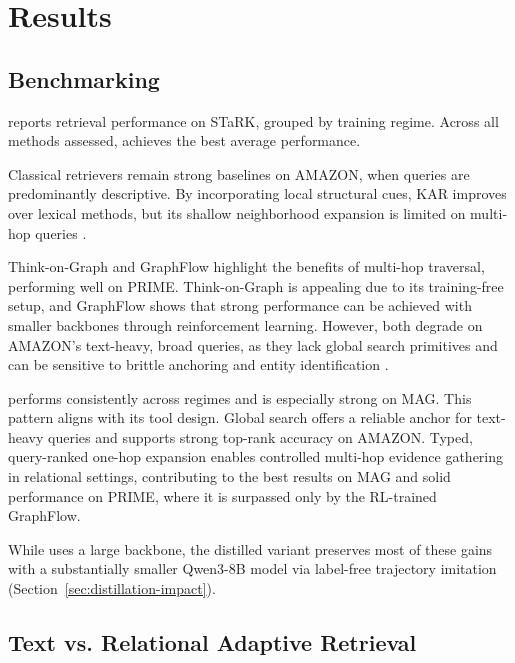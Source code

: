 
\section{Results}

\subsection{Benchmarking}
\FigNAgents
{} reports retrieval performance on STaRK, grouped by training regime. Across all methods assessed, \retrieverShort achieves the best average performance. 

Classical retrievers remain strong baselines on AMAZON, when queries are predominantly descriptive. By incorporating local structural cues, KAR improves over lexical methods, but its shallow neighborhood expansion is limited on multi-hop queries \cite{xia_knowledge-aware_2025}.

Think-on-Graph and GraphFlow highlight the benefits of multi-hop traversal, performing well on PRIME. Think-on-Graph is appealing due to its training-free setup, and GraphFlow shows that strong performance can be achieved with smaller backbones through reinforcement learning. However, both degrade on AMAZON's text-heavy, broad queries, as they lack global search primitives and can be sensitive to brittle anchoring and entity identification \cite{sun_think--graph_2024, yu_can_2025}.

\retrieverShort performs consistently across regimes and is especially strong on MAG. This pattern aligns with its tool design. Global search offers a reliable anchor for text-heavy queries and supports strong top-rank accuracy on AMAZON. Typed, query-ranked one-hop expansion enables controlled multi-hop evidence gathering in relational settings, contributing to the best results on MAG and solid performance on PRIME, where it is surpassed only by the RL-trained GraphFlow.

While \retrieverShort uses a large backbone, the distilled variant preserves most of these gains with a substantially smaller Qwen3-8B model via label-free trajectory imitation (Section~\ref{sec:distillation-impact}).

\subsection{Text vs. Relational Adaptive Retrieval}
\label{sec:adaptive-tool-use}
\FigAdaptiveToolUse[h]

